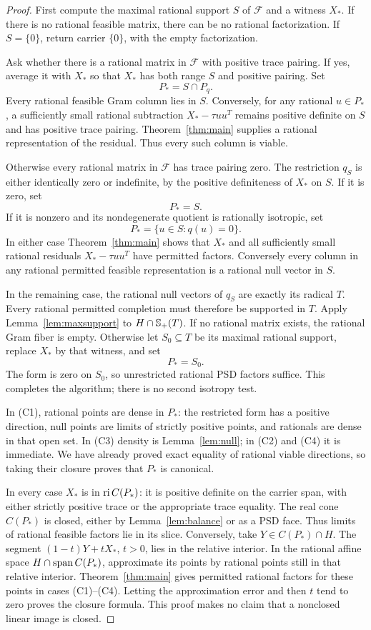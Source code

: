 \begin{proof}
First compute the maximal rational support $S$ of $\mathcal F$ and a witness $X_*$. If there is no rational feasible matrix, there can be no rational factorization. If $S=\{0\}$, return carrier $\{0\}$, with the empty factorization.

Ask whether there is a rational matrix in $\mathcal F$ with positive trace pairing. If yes, average it with $X_*$ so that $X_*$ has both range $S$ and positive pairing. Set
\[
 P_*=S\cap P_q.\tag{C1}
\]
Every rational feasible Gram column lies in $S$. Conversely, for any rational $u\in P_*$, a sufficiently small rational subtraction $X_*-\tau uu^T$ remains positive definite on $S$ and has positive trace pairing. Theorem~\ref{thm:main} supplies a rational representation of the residual. Thus every such column is viable.

Otherwise every rational matrix in $\mathcal F$ has trace pairing zero. The restriction $q_S$ is either identically zero or indefinite, by the positive definiteness of $X_*$ on $S$. If it is zero, set
\[
 P_*=S.\tag{C2}
\]
If it is nonzero and its nondegenerate quotient is rationally isotropic, set
\[
 P_*=\{u\in S:q(u)=0\}.\tag{C3}
\]
In either case Theorem~\ref{thm:main} shows that $X_*$ and all sufficiently small rational residuals $X_*-\tau uu^T$ have permitted factors. Conversely every column in any rational permitted feasible representation is a rational null vector in $S$.

In the remaining case, the rational null vectors of $q_S$ are exactly its radical $T$. Every rational permitted completion must therefore be supported in $T$. Apply Lemma~\ref{lem:maxsupport} to $H\cap\mathbb S_+(T)$. If no rational matrix exists, the rational Gram fiber is empty. Otherwise let $S_0\subseteq T$ be its maximal rational support, replace $X_*$ by that witness, and set
\[
 P_*=S_0.\tag{C4}
\]
The form is zero on $S_0$, so unrestricted rational PSD factors suffice. This completes the algorithm; there is no second isotropy test.

In (C1), rational points are dense in $P_*$: the restricted form has a positive direction, null points are limits of strictly positive points, and rationals are dense in that open set. In (C3) density is Lemma~\ref{lem:null}; in (C2) and (C4) it is immediate. We have already proved exact equality of rational viable directions, so taking their closure proves that $P_*$ is canonical.

In every case $X_*$ is in $\operatorname{ri} C(P_*)$: it is positive definite on the carrier span, with either strictly positive trace or the appropriate trace equality. The real cone $C(P_*)$ is closed, either by Lemma~\ref{lem:balance} or as a PSD face. Thus limits of rational feasible factors lie in its slice. Conversely, take $Y\in C(P_*)\cap H$. The segment $(1-t)Y+tX_*$, $t>0$, lies in the relative interior. In the rational affine space $H\cap\operatorname{span} C(P_*)$, approximate its points by rational points still in that relative interior. Theorem~\ref{thm:main} gives permitted rational factors for these points in cases (C1)--(C4). Letting the approximation error and then $t$ tend to zero proves the closure formula. This proof makes no claim that a nonclosed linear image is closed.
\end{proof}

